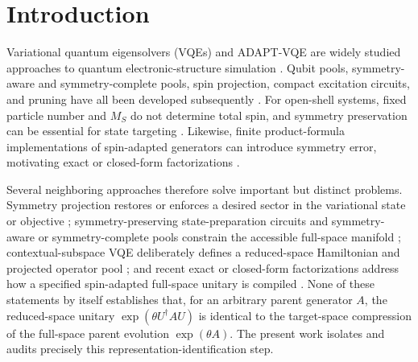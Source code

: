 \documentclass[
 aip,
 jcp,
 amsmath,amssymb,
 preprint
]{revtex4-2}
\begin{document}
\maketitle

\section{Introduction}

Variational quantum eigensolvers (VQEs) and ADAPT-VQE are widely studied approaches to quantum electronic-structure simulation \cite{peruzzo2014vqe,mcclean2016theory,mcardle2020review,grimsley2019adapt}.
Qubit pools, symmetry-aware and symmetry-complete pools, spin projection, compact excitation circuits, and pruning have all been developed subsequently \cite{tang2021qubitadapt,shkolnikov2023roadblocks,bertels2022symmetry,tsuchimochi2022spinproj,magoulas2023cnot,vaquero2025pruned}.
For open-shell systems, fixed particle number and $M_S$ do not determine total spin, and symmetry preservation can be essential for state targeting \cite{gard2020symmetry,seki2020symmetry,seki2022projection,burton2023disco,magoulas2026symmetry}.
Likewise, finite product-formula implementations of spin-adapted generators can introduce symmetry error, motivating exact or closed-form factorizations \cite{magoulas2025closedform,jain2026factorization}.

Several neighboring approaches therefore solve important but distinct problems.
Symmetry projection restores or enforces a desired sector in the variational state or objective \cite{seki2020symmetry,tsuchimochi2022spinproj,seki2022projection}; symmetry-preserving state-preparation circuits and symmetry-aware or symmetry-complete pools constrain the accessible full-space manifold \cite{gard2020symmetry,shkolnikov2023roadblocks,burton2023disco,magoulas2026symmetry}; contextual-subspace VQE deliberately defines a reduced-space Hamiltonian and projected operator pool \cite{weaving2023stabilizer}; and recent exact or closed-form factorizations address how a specified spin-adapted full-space unitary is compiled \cite{magoulas2025closedform,jain2026factorization}.
None of these statements by itself establishes that, for an arbitrary parent generator $A$, the reduced-space unitary $\exp(\theta U^\dagger A U)$ is identical to the target-space compression of the full-space parent evolution $\exp(\theta A)$.
The present work isolates and audits precisely this representation-identification step.
\end{document}
